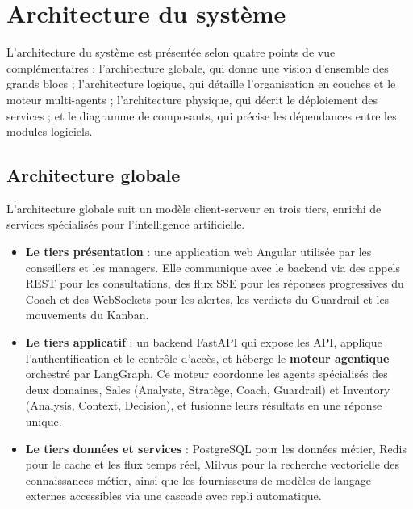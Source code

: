 \section{Architecture du système}

L'architecture du système est présentée selon quatre points de vue complémentaires : l'architecture globale, qui donne une vision d'ensemble des grands blocs ; l'architecture logique, qui détaille l'organisation en couches et le moteur multi-agents ; l'architecture physique, qui décrit le déploiement des services ; et le diagramme de composants, qui précise les dépendances entre les modules logiciels.

\subsection{Architecture globale}

L'architecture globale suit un modèle client-serveur en trois tiers, enrichi de services spécialisés pour l'intelligence artificielle.

\begin{itemize}[label=--]
    \item \textbf{Le tiers présentation} : une application web Angular utilisée par les conseillers et les managers. Elle communique avec le backend via des appels REST pour les consultations, des flux SSE pour les réponses progressives du Coach et des WebSockets pour les alertes, les verdicts du Guardrail et les mouvements du Kanban.

    \item \textbf{Le tiers applicatif} : un backend FastAPI qui expose les API, applique l'authentification et le contrôle d'accès, et héberge le \textbf{moteur agentique} orchestré par LangGraph. Ce moteur coordonne les agents spécialisés des deux domaines, Sales (Analyste, Stratège, Coach, Guardrail) et Inventory (Analysis, Context, Decision), et fusionne leurs résultats en une réponse unique.

    \item \textbf{Le tiers données et services} : PostgreSQL pour les données métier, Redis pour le cache et les flux temps réel, Milvus pour la recherche vectorielle des connaissances métier, ainsi que les fournisseurs de modèles de langage externes accessibles via une cascade avec repli automatique.
\end{itemize}

